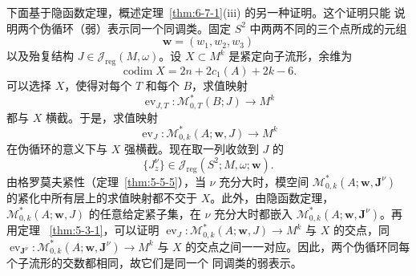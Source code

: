 \begin{remark}\label{rem:6-7-12}
下面基于隐函数定理，概述定理~\ref{thm:6-7-1}\textup{(iii)} 的另一种证明。这个证明只能
说明两个伪循环（弱）表示同一个同调类。固定 $S^2$ 中两两不同的三个点所成的元组
\[
  \mathbf w=(w_1,w_2,w_3)
\]
以及殆复结构 $J\in\mathcal J_{\mathrm{reg}}(M,\omega)$。设
$X\subset M^k$ 是紧定向子流形，余维为
\[
  \operatorname{codim}X=2n+2c_1(A)+2k-6.
\]
可以选择 $X$，使得对每个 $T$ 和每个 $B$，求值映射
\[
  \operatorname{ev}_{J,T}:\mathcal M^*_{0,T}(B;J)\longrightarrow M^k
\]
都与 $X$ 横截。于是，求值映射
\[
  \operatorname{ev}_J:\mathcal M^*_{0,k}(A;\mathbf w,J)\longrightarrow M^k
\]
在伪循环的意义下与 $X$ 强横截。现在取一列收敛到 $J$ 的
\[
  \{J_z^\nu\}\in
  \mathcal J_{\mathrm{reg}}(S^2;M,\omega;\mathbf w).
\]
由格罗莫夫紧性（定理~\ref{thm:5-5-5}），当 $\nu$ 充分大时，模空间
$\mathcal M^*_{0,k}(A;\mathbf w,\mathbf J^\nu)$ 的紧化中所有层上的求值映射都不交于
$X$。此外，由隐函数定理，$\mathcal M^*_{0,k}(A;\mathbf w,J)$ 的任意给定紧子集，在
$\nu$ 充分大时都嵌入 $\mathcal M^*_{0,k}(A;\mathbf w,\mathbf J^\nu)$。再用定理
~\ref{thm:5-3-1}，可以证明 $\operatorname{ev}_J:\mathcal M^*_{0,k}(A;\mathbf w,J)\to M^k$ 与 $X$
的交点，同 $\operatorname{ev}_{\mathbf J^\nu}:\mathcal M^*_{0,k}(A;\mathbf w,\mathbf J^\nu)\to M^k$
与 $X$ 的交点之间一一对应。因此，两个伪循环同每个子流形的交数都相同，故它们是同一个
同调类的弱表示。
\end{remark}

